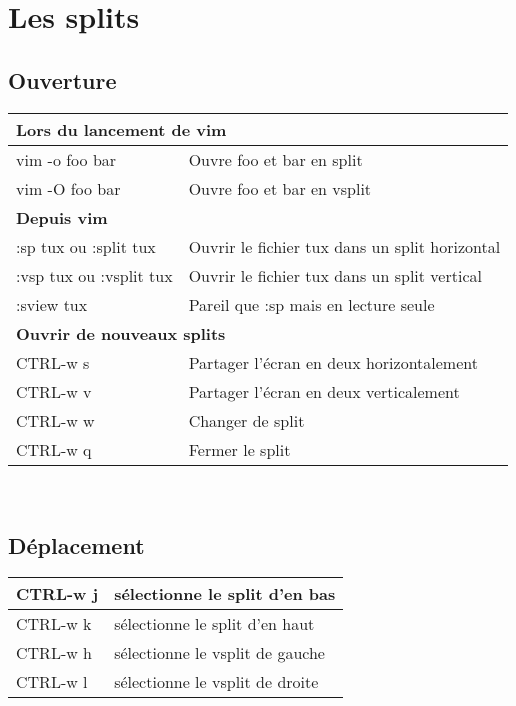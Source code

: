 \documentclass{article}
\begin{document}
                    \section{Les splits}
                    \subsection{Ouverture}
                    \begin{tabular}{|p{4cm}| l| }\hline
                        \multicolumn{2}{|l|}{\textbf{Lors du lancement de vim }} \\ \hline
                        vim -o foo bar & Ouvre foo et bar en split\\ \hline
                        vim -O foo bar & Ouvre foo et bar en vsplit\\ \hline
                        \multicolumn{2}{|l|}{\textbf{Depuis vim}}\\ \hline
                        :sp tux ou :split tux & Ouvrir le fichier tux dans un split horizontal \\ \hline
                        :vsp tux ou :vsplit tux & Ouvrir le fichier tux dans un split vertical \\ \hline
                        :sview tux & Pareil que :sp mais en lecture seule \\ \hline
                        \multicolumn{2}{|l|}{\textbf{Ouvrir de nouveaux splits }} \\ \hline
                        CTRL-w s & Partager l'écran en deux horizontalement \\ \hline
                        CTRL-w v & Partager l'écran en deux verticalement \\ \hline
                        CTRL-w w & Changer de split \\ \hline
                        CTRL-w q & Fermer le split \\ \hline
                    \end{tabular}\\

                    \subsection{Déplacement}

                    \begin{tabular}{|p{3cm}| l| }\hline
                        CTRL-w j & sélectionne le split d'en bas\\ \hline
                        CTRL-w k & sélectionne le split d'en haut\\ \hline
                        CTRL-w h & sélectionne le vsplit de gauche\\ \hline
                        CTRL-w l & sélectionne le vsplit de droite\\ \hline
                    \end{tabular}\\
\end{document}
